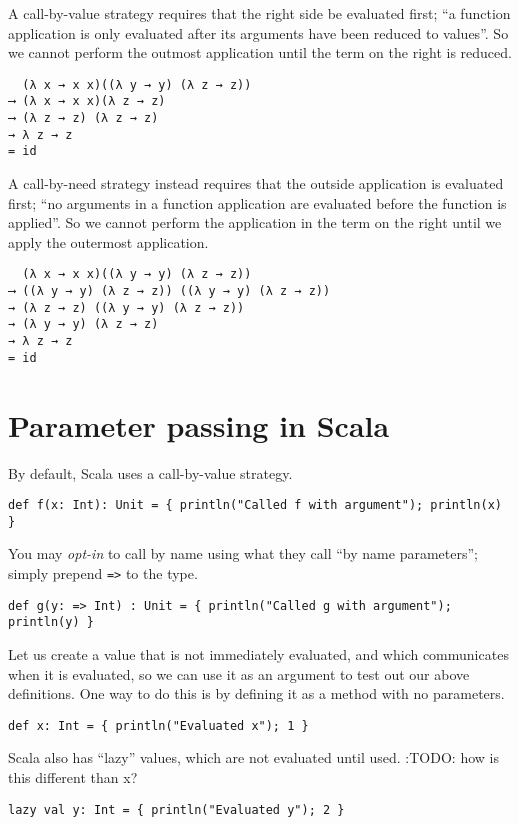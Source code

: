 \documentclass[11pt]{article}
\begin{document}
A call-by-value strategy requires that the right side be evaluated first;
“a function application is only evaluated
after its arguments have been reduced to values”.
So we cannot perform the outmost application until the term on the right
is reduced.
\begin{verbatim}
  (λ x → x x)((λ y → y) (λ z → z))
⟶ (λ x → x x)(λ z → z)
⟶ (λ z → z) (λ z → z)
→ λ z → z
= id
\end{verbatim}

A call-by-need strategy instead requires that the outside
application is evaluated first;
“no arguments in a function application are evaluated before
the function is applied”.
So we cannot perform the application in the term on the right
until we apply the outermost application.
\begin{verbatim}
  (λ x → x x)((λ y → y) (λ z → z))
⟶ ((λ y → y) (λ z → z)) ((λ y → y) (λ z → z))
→ (λ z → z) ((λ y → y) (λ z → z))
→ (λ y → y) (λ z → z)
→ λ z → z
= id
\end{verbatim}

\section{Parameter passing in Scala}
\label{sec:orgaa8f79b}

By default, Scala uses a call-by-value strategy.
\begin{verbatim}
def f(x: Int): Unit = { println("Called f with argument"); println(x) }
\end{verbatim}

You may \emph{opt-in} to call by name using what they call “by name parameters”;
simply prepend \texttt{=>} to the type.
\begin{verbatim}
def g(y: => Int) : Unit = { println("Called g with argument"); println(y) }
\end{verbatim}

Let us create a value that is not immediately evaluated,
and which communicates when it is evaluated,
so we can use it as an argument to test out our above definitions.
One way to do this is by defining it as a method with no parameters.
\begin{verbatim}
def x: Int = { println("Evaluated x"); 1 }
\end{verbatim}

Scala also has “lazy” values, which are not evaluated until used.
:TODO: how is this different than x?
\begin{verbatim}
lazy val y: Int = { println("Evaluated y"); 2 }
\end{verbatim}
\end{document}
